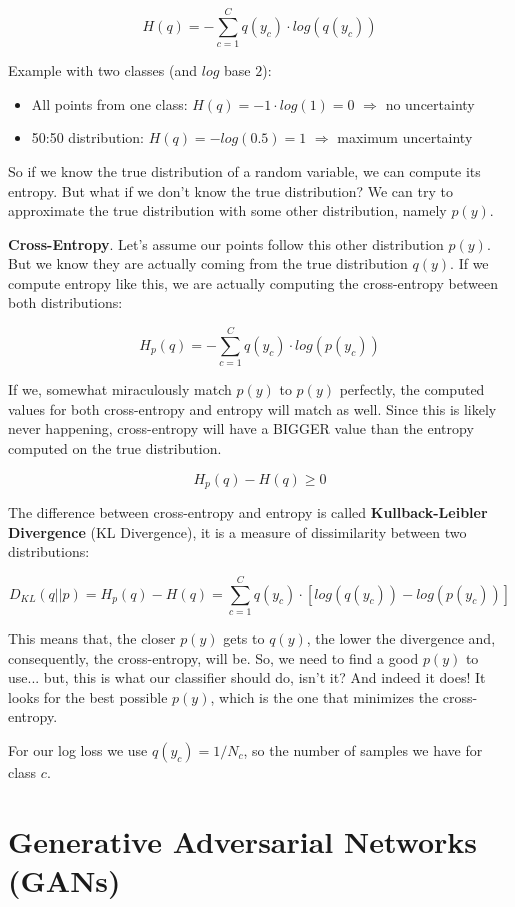\documentclass{scrartcl}
\begin{document}
$$H(q) = - \sum_{c=1}^C q(y_c) \cdot log(q(y_c))$$

Example with two classes (and $log$ base $2$):
\begin{itemize}
	\item
		All points from one class: $H(q) = - 1 \cdot log(1) = 0$ $\Rightarrow$ no uncertainty
	\item
		50:50 distribution: $H(q) = -log(0.5) = 1$ $\Rightarrow$ maximum uncertainty
\end{itemize}

So if we know the true distribution of a random variable, we can compute its entropy. But what if we don't know the true distribution? We can try to approximate the true distribution with some other distribution, namely $p(y)$.

\textbf{Cross-Entropy}. Let's assume our points follow this other distribution $p(y)$. But we know they are actually coming from the true distribution $q(y)$. If we compute entropy like this, we are actually computing the cross-entropy between both distributions:

$$H_p(q) = - \sum_{c=1}^C q(y_c) \cdot log(p(y_c))$$

If we, somewhat miraculously match $p(y)$ to $p(y)$ perfectly, the computed values for both cross-entropy and entropy will match as well. Since this is likely never happening, cross-entropy will have a BIGGER value than the entropy computed on the true distribution.

$$H_p(q) - H(q) \geq 0$$

The difference between cross-entropy and entropy is called \textbf{Kullback-Leibler Divergence} (KL Divergence), it is a measure of dissimilarity between two distributions:

$$D_{KL}(q||p) = H_p(q) - H(q) = \sum_{c=1}^C q(y_c) \cdot [log(q(y_c)) - log(p(y_c))]$$

This means that, the closer $p(y)$ gets to $q(y)$, the lower the divergence and, consequently, the cross-entropy, will be. So, we need to find a good $p(y)$ to use... but, this is what our classifier should do, isn't it? And indeed it does! It looks for the best possible $p(y)$, which is the one that minimizes the cross-entropy.

For our log loss we use $q(y_c) = 1/N_c$, so the number of samples we have for class $c$.

\section[Generative Adversarial Networks (GANs)]{Generative Adversarial Networks (GANs) \cite{goodfellow2016nips}}
\end{document}

